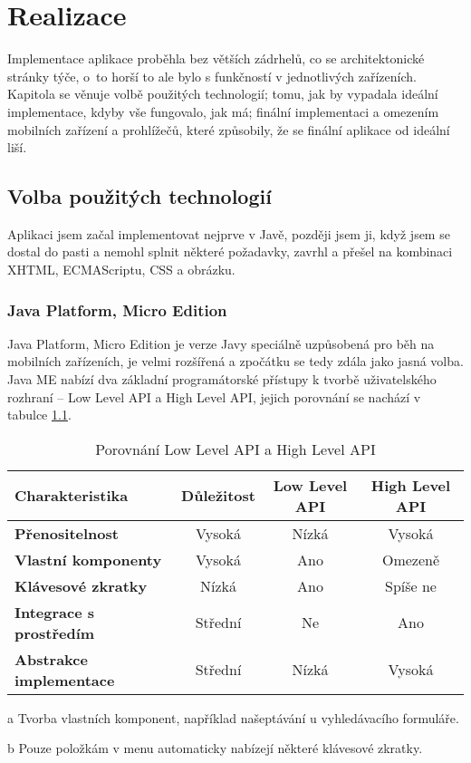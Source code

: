\chapter{Realizace}
Implementace aplikace proběhla bez větších zádrhelů, co se architektonické stránky týče, o~to horší to ale bylo s funkčností v jednotlivých zařízeních. Kapitola se věnuje volbě použitých technologií; tomu, jak by vypadala ideální implementace, kdyby vše fungovalo, jak má; finální implementaci a omezením mobilních zařízení a prohlížečů, které způsobily, že se finální aplikace od ideální liší.

\section{Volba použitých technologií}
Aplikaci jsem začal implementovat nejprve v Javě, později jsem ji, když jsem se dostal do pasti a nemohl splnit některé požadavky, zavrhl a přešel na kombinaci XHTML, ECMAScriptu, CSS a obrázku.
\subsection{Java Platform, Micro Edition}
Java Platform, Micro Edition je verze Javy speciálně uzpůsobená pro běh na mobilních zařízeních, je velmi rozšířená a zpočátku se tedy zdála jako jasná volba. Java ME nabízí dva základní programátorské přístupy k tvorbě uživatelského rozhraní -- Low Level API a High Level API, jejich porovnání se nachází v tabulce \ref{tab:lowLevelApiVsHighLevelApi}. 

\begin{table}
\begin{center}
\begin{threeparttable}
\begin{tabular}{|l|c|c|c|}
\hline
\textbf{Charakteristika} & \textbf{Důležitost} & \textbf{Low Level API} & \textbf{High Level API} \\
\hline
\textbf{Přenositelnost} & Vysoká & Nízká & Vysoká \\
\textbf{Vlastní komponenty}\tnote{a} & Vysoká & Ano & Omezeně \\
\textbf{Klávesové zkratky} & Nízká & Ano & Spíše ne\tnote{b} \\
\textbf{Integrace s prostředím} & Střední & Ne & Ano \\
\textbf{Abstrakce implementace} & Střední & Nízká & Vysoká \\
\hline
\end{tabular}
\begin{tablenotes}
\item[a] Tvorba vlastních komponent, například našeptávání u vyhledávacího formuláře.
\item[b] Pouze položkám v menu automaticky nabízejí některé klávesové zkratky.
\end{tablenotes}
\caption{Porovnání Low Level API a High Level API}
\label{tab:lowLevelApiVsHighLevelApi}
\end{threeparttable}
\end{center}
\end{table}

